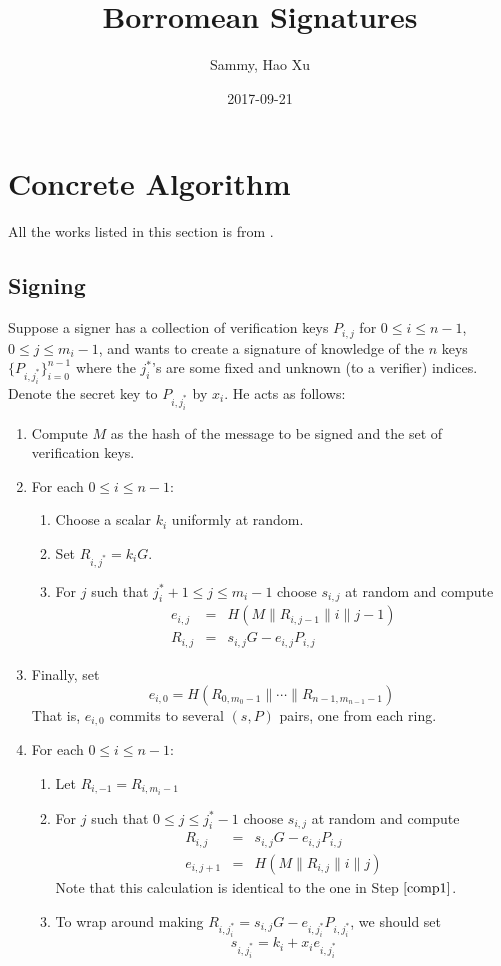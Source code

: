 \documentclass[a4paper,10pt]{article}
\title{Borromean Signatures}
\author{Sammy, Hao Xu}
\date{2017-09-21}
\begin{document}
\maketitle

\section{Concrete Algorithm}
All the works listed in this section is from \cite{borromean-ring-signatures}.
\subsection{Signing}
Suppose a signer has a collection of verification keys $P_{i,j}$ for $0\leq i\leq n-1$, $0\leq j\leq m_i-1$, and wants to create a signature of knowledge of the $n$ keys $\{P_{i,j^*_i}\}_{i=0}^{n-1}$ where the $j^*_i$'s are some fixed and unknown (to a verifier) indices. Denote the secret key to $P_{i,j^*_i}$ by $x_i$. He acts as follows: 
\begin{enumerate}
	\item Compute $M$ as the hash of the message to be signed and the set of verification keys.
	\item For each $0\leq i\leq n-1$:
		\begin{enumerate}
			\item Choose a scalar $k_i$ uniformly at random.
			\item Set $R_{i,j^*} = k_iG$.
			\item For $j$ such that $j^*_i+1\leq j\leq m_i - 1$ choose $s_{i,j}$ at random and compute\label{comp1}
				\begin{eqnarray}
					e_{i,j} &= &H(M\| R_{i,j-1} \| i \| j - 1)	\\
					R_{i,j} &= &s_{i,j}G - e_{i,j}P_{i,j}
				\end{eqnarray}
		\end{enumerate}
	\item Finally, set 
			\[ 
				e_{i,0} = H(R_{0,m_0-1} \| \cdots \| R_{n-1,m_{n-1}-1}) 
			\] 
			That is, $e_{i,0}$ commits to several $(s, P)$ pairs, one from each ring.
	\item For each $0\leq i\leq n-1$:
		\begin{enumerate}
			\item Let \(R_{i,-1}=R_{i,m_i-1}\)
			\item For $j$ such that $0\leq j\leq j^*_i - 1$ choose $s_{i,j}$ at random and compute 
				\begin{eqnarray}
					R_{i,j} &= &s_{i,j}G-e_{i,j}P_{i,j} \\
					e_{i,j+1} &= &H(M\| R_{i,j}\|i\|j) 
				\end{eqnarray}
				Note that this calculation is identical to the one in Step $\ref{comp1}$.
			\item To wrap around making \(R_{i,j_i^*}=s_{i,j}G-e_{i,j_i^*}P_{i,j_i^*}\), we should set
				\begin{equation}
					s_{i,j_i^*}=k_i+x_i e_{i,j_i^*}
				\end{equation}
		\end{enumerate}
\end{enumerate}
\end{document}

